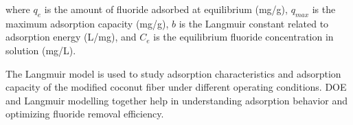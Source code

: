 where $q_e$ is the amount of fluoride adsorbed at equilibrium (mg/g), 
$q_{max}$ is the maximum adsorption capacity (mg/g), 
$b$ is the Langmuir constant related to adsorption energy (L/mg), 
and $C_e$ is the equilibrium fluoride concentration in solution (mg/L).

The Langmuir model is used to study adsorption characteristics and adsorption capacity of the modified coconut fiber under different operating conditions. DOE and Langmuir modelling together help in understanding adsorption behavior and optimizing fluoride removal efficiency. 

%
%
%
